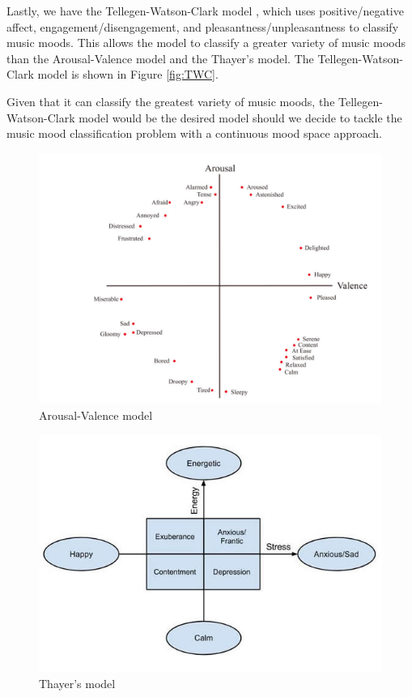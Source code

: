 Lastly, we have the Tellegen-Watson-Clark model \cite{Watson1985} \cite{Tellegen1999}, which uses positive/negative affect, engagement/disengagement, and pleasantness/unpleasantness to classify music moods. This allows the model to classify a greater variety of music moods than the Arousal-Valence model and the Thayer's model. The Tellegen-Watson-Clark model is shown in Figure \ref{fig:TWC}.

Given that it can classify the greatest variety of music moods, the Tellegen-Watson-Clark model would be the desired model should we decide to tackle the music mood classification problem with a continuous mood space approach. 

\begin{figure}
    \centering
    \includegraphics[scale=0.4]{Figures/Arousal-Valence model}
    \decoRule
    \caption{Arousal-Valence model \cite{MoodIoT}}
    \label{fig:circumplex}
    \end{figure}


\begin{figure}
    \centering
    \includegraphics[scale=0.4]{Figures/Thayers model}
    \decoRule
    \caption{Thayer's model \cite{circumplexbook}}
    \label{fig:Thayers}
    \end{figure}

